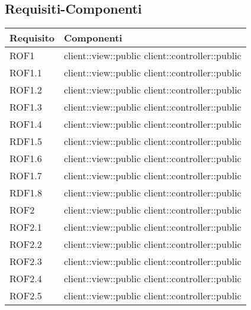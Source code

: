 \subsection{Requisiti-Componenti} %
\label{sub:componenti_requisiti}
\begin{center}
\def\arraystretch{1.5}
\bgroup
\begin{longtable}{| p{4cm} | p{8cm} |}
\hline
\textbf{Requisito} & \textbf{Componenti} \\
\hline


ROF1   &  client::view::public \newline client::controller::public \\
\hline
ROF1.1   &  client::view::public \newline client::controller::public \\
\hline
ROF1.2   &  client::view::public \newline client::controller::public \\
\hline
ROF1.3   &  client::view::public \newline client::controller::public \\
\hline
ROF1.4   &  client::view::public \newline client::controller::public \\
\hline
RDF1.5   &  client::view::public \newline client::controller::public \\
\hline
ROF1.6   &  client::view::public \newline client::controller::public \\
\hline
ROF1.7   &  client::view::public \newline client::controller::public \\
\hline
RDF1.8   &  client::view::public \newline client::controller::public \\
\hline

ROF2   &  client::view::public \newline client::controller::public \\
\hline
ROF2.1   &  client::view::public \newline client::controller::public \\
\hline
ROF2.2   &  client::view::public \newline client::controller::public \\
\hline
ROF2.3   &  client::view::public \newline client::controller::public \\
\hline
ROF2.4   &  client::view::public \newline client::controller::public \\
\hline
ROF2.5   &  client::view::public \newline client::controller::public \\
\hline


\end{longtable}
\end{center}
